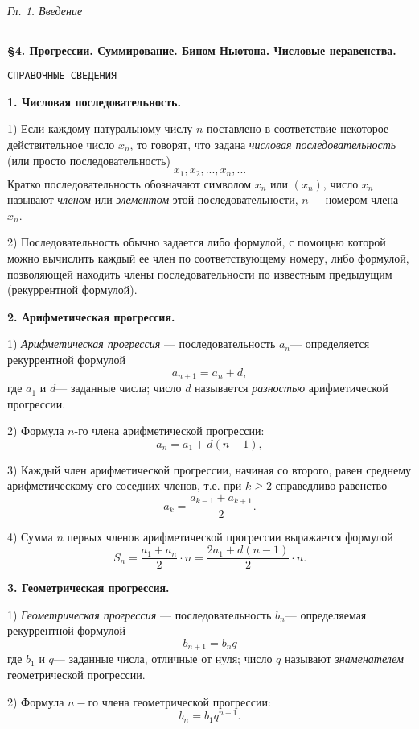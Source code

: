 \documentclass[a5paper, 16pt]{book}
\date{21.03.2023}
\author{Никита Мозговой}
\begin{document}
    \begin{center}
        \begin{spacing}
            \textit{Гл. 1. Введение}
            \noindent\rule{\textwidth}{1pt}
		\end{spacing}
    \end{center}
    \begin{center}
        \textbf{\S4. Прогрессии. Суммирование. Бином Ньютона. Числовые неравенства.}
    \end{center}
    \par\texttt{СПРАВОЧНЫЕ СВЕДЕНИЯ}
    \par\textbf{1. Числовая последовательность.}
    \par1) Если каждому натуральному числу $n$ поставлено в соответствие некоторое действительное число $x_n$, то говорят, что задана \textit{числовая последовательность} (или просто последовательность)
    $$x_1, x_2, ..., x_n, ... $$
    Кратко последовательность обозначают символом ${x_n}$ или $(x_n)$, число $x_n$ называют \textit{членом} или \textit{элементом} этой последовательности, $n \, \textbf{---}$ номером члена $x_n$.
    \par2) Последовательность обычно задается либо формулой, с помощью которой можно вычислить каждый ее член по соответствующему номеру, либо формулой, позволяющей находить члены последовательности по известным предыдущим (рекуррентной формулой).
    \par\textbf{2. Арифметическая прогрессия.}
    \par1) \textit{Арифметическая прогрессия} $\textbf{---}$ последовательность ${a_n} \textbf{---}$ определяется рекуррентной формулой
    $$a_{n+1} = a_n + d,$$
    где $a_1$ и $d \textbf{---}$ заданные числа; число $d$ называется \textit{разностью} арифметической прогрессии.
    \par2) Формула $n$-го члена арифметической прогрессии:
    $$a_n = a_1 + d(n - 1),$$
    \par3) Каждый член арифметической прогрессии, начиная со второго, равен среднему арифметическому его соседних членов, т.е. при $k \geq 2$ справедливо равенство
    $$a_k = \frac{a_{k - 1} + a_{k + 1}}{2}.$$
    \par4) Сумма $n$ первых членов арифметической прогрессии выражается формулой
    $$S_n = \frac{a_1 + a_n}{2} \cdot n = \frac{2a_1 + d(n - 1)}{2} \cdot n.$$
    \par\textbf{3. Геометрическая прогрессия.}
    \par1) \textit{Геометрическая прогрессия} $\textbf{---}$ последовательность ${b_n} \textbf{---}$ определяемая рекуррентной формулой
    $$b_{n + 1} = b_n q$$
    где $b_1$ и $q \textbf{---}$ заданные числа, отличные от нуля; число $q$ называют \textit{знаменателем} геометрической прогрессии.
    \par2) Формула $n-$го члена геометрической прогрессии:
    $$b_n = b_1 q^{n - 1} .$$
\end{document}
